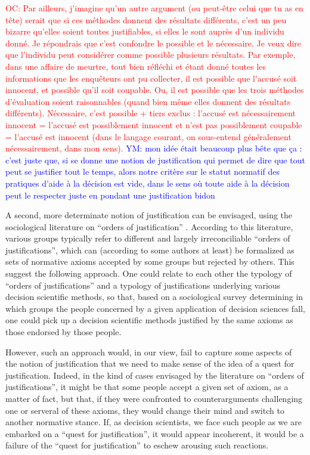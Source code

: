 \documentclass[preprint, french, english, 11pt, authoryear]{elsarticle}%
\newcommand{\commentYM}[1]{\textcolor{blue}{YM: #1}}
\newcommand{\commentOC}[1]{\textcolor{red}{OC: #1}}
\begin{document}
\commentOC{ Par ailleurs, j’imagine qu’un autre argument (ou peut-être celui que tu as en tête) serait que si ces méthodes donnent des résultats différents, c’est un peu bizarre qu’elles soient toutes justifiables, si elles le sont auprès d’un individu donné. Je répondrais que c’est confondre le possible et le nécessaire. Je veux dire que l’individu peut considérer comme possible plusieurs résultats. Par exemple, dans une affaire de meurtre, tout bien réfléchi et étant donné toutes les informations que les enquêteurs ont pu collecter, il est possible que l’accusé soit innocent, et possible qu’il soit coupable. Ou, il est possible que les trois méthodes d’évaluation soient raisonnables (quand bien même elles donnent des résultats différents). Nécessaire, c’est possible + tiers exclus : l’accusé est nécessairement innocent = l’accusé est possiblement innocent et n’est pas possiblement coupable = l’accusé est innocent (dans le langage courant, on sous-entend généralement \og{}nécessairement\fg{}, dans mon sens).}
\commentYM{mon idée était beaucoup plus bête que ça : c'est juste que, si se donne une notion de justification qui permet de dire que tout peut se justifier tout le temps, alors notre critère sur le statut normatif des pratiques d'aide à la décision est vide, dans le sens où toute aide à la décision peut le respecter juste en pondant une justification bidon}  

A second, more determinate notion of justification can be envisaged, using the sociological literature on ``orders of justification'' \citep{boltanski_justification_2006}. According to this literature, various groups typically refer to different and largely irreconciliable ``orders of justifications'', which can (according to some authors at least) be formalized as sets of normative axioms accepted by some groups but rejected by others. This suggest the following approach. One could relate to each other the typology of ``orders of justifications'' and a typology of justifications underlying various decision scientific methods, so that, based on a sociological survey determining in which groups the people concerned by a given application of decision sciences fall, one could pick up a decision scientific methods justified by the same axioms as those endorsed by those people.

However, such an approach would, in our view, fail to capture some aspects of the notion of justification that we need to make sense of the idea of a quest for justification. Indeed, in the kind of cases envisaged by the literature on ``orders of justifications'', it might be that some people accept a given set of axiom, as a matter of fact, but that, if they were confronted to counterarguments challenging one or serveral of these axioms, they would change their mind and switch to another normative stance. If, as decision scientists, we face such people as we are embarked on a ``quest for justification'', it would appear incoherent, it would be a failure of the ``quest for justification'' to eschew arousing such reactions. 
\end{document}
